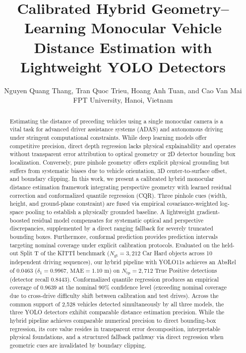 \documentclass[]{spie}  %
\title{Calibrated Hybrid Geometry--Learning Monocular Vehicle Distance Estimation with Lightweight YOLO Detectors}
\author{Nguyen Quang Thang\supit{a}, Tran Quoc Trieu\supit{a}, Hoang Anh Tuan\supit{a}, and Cao Van Mai\supit{a}
\skiplinehalf
\supit{a}FPT University, Hanoi, Vietnam
}
\begin{document}
\maketitle

\begin{abstract}
Estimating the distance of preceding vehicles using a single monocular camera is a vital task for advanced driver assistance systems (ADAS) and autonomous driving under stringent computational constraints. While deep learning models offer competitive precision, direct depth regression lacks physical explainability and operates without transparent error attribution to optical geometry or 2D detector bounding box localization. Conversely, pure pinhole geometry offers explicit physical grounding but suffers from systematic biases due to vehicle orientation, 3D center-to-surface offset, and boundary clipping. In this work, we present a calibrated hybrid monocular distance estimation framework integrating perspective geometry with learned residual correction and conformalized quantile regression (CQR). Three pinhole cues (width, height, and ground-plane constraint) are fused via empirical covariance-weighted log-space pooling to establish a physically grounded baseline. A lightweight gradient-boosted residual model compensates for systematic optical and perspective discrepancies, supplemented by a direct ranging fallback for severely truncated bounding boxes. Furthermore, conformal prediction provides prediction intervals targeting nominal coverage under explicit calibration protocols. Evaluated on the held-out Split T of the KITTI benchmark ($N_{\text{gt}} = 3,212$ Car Hard objects across 10 independent driving sequences), our hybrid pipeline with YOLO11s achieves an AbsRel of 0.0463 ($\delta_1 = 0.9967$, $\text{MAE} = 1.10\text{ m}$) on $N_{\text{tp}} = 2,712$ True Positive detections (detector recall 0.8443). Conformalized quantile regression produces an empirical coverage of 0.9639 at the nominal 90\% confidence level (exceeding nominal coverage due to cross-drive difficulty shift between calibration and test drives). Across the common support of 2,528 vehicles detected simultaneously by all three models, the three YOLO detectors exhibit comparable distance estimation precision. While the hybrid pipeline achieves comparable numerical precision to direct bounding-box regression, its core value resides in transparent error decomposition, interpretable physical foundations, and a structured fallback pathway via direct regression when geometric cues are invalidated by boundary clipping.
\end{abstract}
\end{document}
